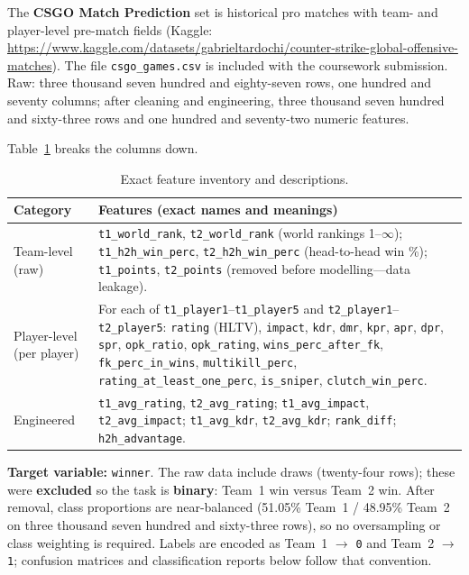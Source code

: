 \documentclass[12pt,a4paper]{article}
\begin{document}
The \textbf{CSGO Match Prediction} set is historical pro matches with team- and player-level pre-match fields (Kaggle: \url{https://www.kaggle.com/datasets/gabrieltardochi/counter-strike-global-offensive-matches}). The file \texttt{csgo\_games.csv} is included with the coursework submission. Raw: three thousand seven hundred and eighty-seven rows, one hundred and seventy columns; after cleaning and engineering, three thousand seven hundred and sixty-three rows and one hundred and seventy-two numeric features.

Table~\ref{tab:features_overview} breaks the columns down.

\begin{table}[H]
\centering
\caption{Exact feature inventory and descriptions.}
\label{tab:features_overview}
\begin{tabularx}{\textwidth}{lX}
\toprule
\textbf{Category} & \textbf{Features (exact names and meanings)} \\
\midrule
Team-level (raw) & \texttt{t1\_world\_rank}, \texttt{t2\_world\_rank} (world rankings 1--$\infty$); \texttt{t1\_h2h\_win\_perc}, \texttt{t2\_h2h\_win\_perc} (head-to-head win \%); \texttt{t1\_points}, \texttt{t2\_points} (removed before modelling---data leakage). \\
\midrule
Player-level (per player) & For each of \texttt{t1\_player1}--\texttt{t1\_player5} and \texttt{t2\_player1}--\texttt{t2\_player5}: \texttt{rating} (HLTV), \texttt{impact}, \texttt{kdr}, \texttt{dmr}, \texttt{kpr}, \texttt{apr}, \texttt{dpr}, \texttt{spr}, \texttt{opk\_ratio}, \texttt{opk\_rating}, \texttt{wins\_perc\_after\_fk}, \texttt{fk\_perc\_in\_wins}, \texttt{multikill\_perc}, \texttt{rating\_at\_least\_one\_perc}, \texttt{is\_sniper}, \texttt{clutch\_win\_perc}. \\
\midrule
Engineered & \texttt{t1\_avg\_rating}, \texttt{t2\_avg\_rating}; \texttt{t1\_avg\_impact}, \texttt{t2\_avg\_impact}; \texttt{t1\_avg\_kdr}, \texttt{t2\_avg\_kdr}; \texttt{rank\_diff}; \texttt{h2h\_advantage}. \\
\bottomrule
\end{tabularx}
\end{table}

\textbf{Target variable:} \texttt{winner}. The raw data include draws (twenty-four rows); these were \textbf{excluded} so the task is \textbf{binary}: Team~1 win versus Team~2 win. After removal, class proportions are near-balanced (51.05\% Team~1 / 48.95\% Team~2 on three thousand seven hundred and sixty-three rows), so no oversampling or class weighting is required. Labels are encoded as Team~1 $\rightarrow$ \texttt{0} and Team~2 $\rightarrow$ \texttt{1}; confusion matrices and classification reports below follow that convention.
\end{document}
